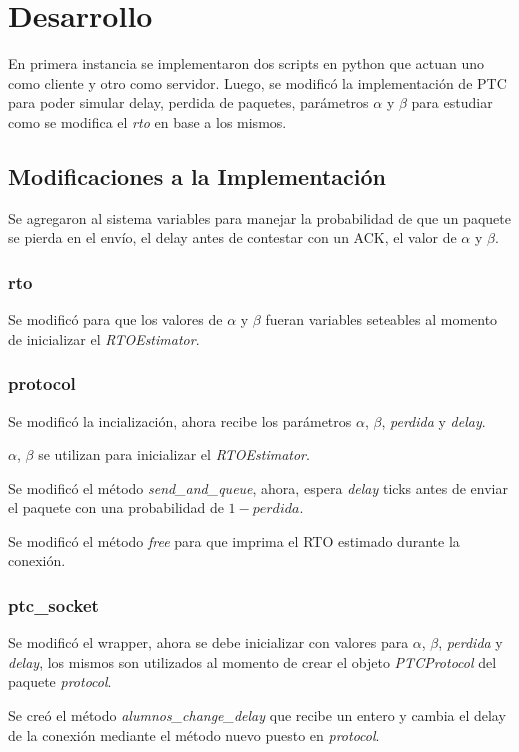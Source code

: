 \section{Desarrollo}

    En primera instancia se implementaron dos scripts en python que 
    actuan uno como cliente y otro como servidor.
    Luego, se modific\'o la implementaci\'on de PTC para poder simular
    delay, perdida de paquetes, par\'ametros $\alpha$ y $\beta$ para 
    estudiar como se modifica el \textit{rto} en base a los mismos.  

\subsection{Modificaciones a la Implementaci\'on}
    Se agregaron al sistema variables para manejar la probabilidad de que 
    un paquete se pierda en el env\'io, el delay antes de contestar con 
    un ACK, el valor de $\alpha$ y $\beta$.

\subsubsection{rto}
    Se modific\'o para que los valores de $\alpha$ y $\beta$ fueran 
    variables seteables al momento de inicializar el \textit{RTOEstimator}.
    
\subsubsection{protocol}
    Se modific\'o la incializaci\'on, ahora recibe los par\'ametros 
    $\alpha$, $\beta$, \textit{perdida} y \textit{delay}.
    
    $\alpha$, $\beta$ se utilizan para inicializar el \textit{RTOEstimator}.
    
    Se modific\'o el m\'etodo \textit{send\_and\_queue}, ahora, espera 
    \textit{delay} ticks antes de enviar el paquete con una probabilidad
    de $1-perdida$.

    Se modific\'o el m\'etodo \textit{free} para que imprima el RTO 
    estimado durante la conexi\'on.        
    
\subsubsection{ptc\_socket}
    Se modific\'o el wrapper, ahora se debe inicializar con valores para 
    $\alpha$, $\beta$, \textit{perdida} y \textit{delay}, los mismos son
    utilizados al momento de crear el objeto \textit{PTCProtocol} del 
    paquete \textit{protocol}.
    
    Se cre\'o el m\'etodo \textit{alumnos\_change\_delay} que recibe un
    entero y cambia el delay de la conexi\'on mediante el m\'etodo nuevo
    puesto en \textit{protocol}.
